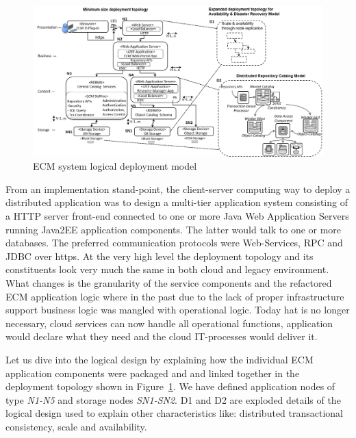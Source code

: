 \documentclass[EPiC]{easychair} %
\begin{document}
\begin{figure}[hbt!]
	\begin{centering}
	\includegraphics[width=1.0\textwidth]{pics/ECMpic16a}
	\caption{ECM system logical deployment model}
	\label{fig:ecm-model-deployment}
	\end{centering}
\end{figure}
    
    \noindent From an implementation stand-point, the client-server computing way to deploy a distributed application was to design a multi-tier application system consisting of a HTTP server front-end connected to one or more Java Web Application Servers running Java2EE application components. The latter would talk to one or more databases. The preferred communication protocols were Web-Services, RPC and JDBC over https. At the very high level the deployment topology and its constituents look very much the same in both cloud and legacy environment. What changes is the  granularity of the service components and the refactored ECM application logic where in the past due to the lack of proper infrastructure support business logic was mangled with operational logic. Today hat is no longer necessary, cloud services can now handle all operational functions, application would declare what they need and the cloud IT-processes would deliver it.  

    \noindent Let us dive into the logical design by explaining how the individual ECM application components were packaged and and linked together in the deployment topology shown in Figure~\ref{fig:ecm-model-deployment}. We have defined application nodes of type \textit{N1-N5} and storage nodes \textit{SN1-SN2}. D1 and D2 are exploded details of the logical design used to explain other characteristics like: distributed transactional consistency, scale and availability. 
    
\end{document}
